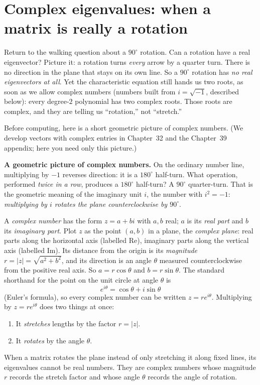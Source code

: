 \section{Complex eigenvalues: when a matrix is really a rotation}
\label{ch23:complex}

Return to the walking question about a $90^\circ$ rotation. Can a rotation have a
real eigenvector? Picture it: a rotation turns \emph{every} arrow by a quarter
turn. There is no direction in the plane that stays on its own line. So a $90^\circ$
rotation has \emph{no real eigenvectors at all}. Yet the characteristic equation
still hands us two roots, as soon as we allow complex numbers (numbers built
from $i=\sqrt{-1}$, described below): every degree-$2$ polynomial has two complex
roots. Those roots are complex, and they are telling us ``rotation,''
not ``stretch.''

Before computing, here is a short geometric picture of complex numbers. (We
develop vectors with complex entries in Chapter~32 and the Chapter~39 appendix;
here you need only this picture.)

\begin{intuitionbox}
\textbf{A geometric picture of complex numbers.}
On the ordinary number line, multiplying by $-1$ reverses direction: it is a
$180^\circ$ half-turn. What operation, performed \emph{twice in a row}, produces a
$180^\circ$ half-turn? A $90^\circ$ quarter-turn. That is the geometric meaning of the
imaginary unit $i$, the number with $i^2=-1$: \emph{multiplying by $i$ rotates the
plane counterclockwise by $90^\circ$}.

A \emph{complex number} has the form $z = a + bi$ with $a,b$ real; $a$ is its
\emph{real part} and $b$ its \emph{imaginary part}. Plot $z$ as the point $(a,b)$
in a plane, the \emph{complex plane}: real parts along the horizontal axis
(labelled Re), imaginary parts along the vertical axis (labelled Im).
Its distance from the origin is its \emph{magnitude} $r = |z| = \sqrt{a^2+b^2}$, and
its direction is an angle $\theta$ measured counterclockwise from the positive real
axis. So $a=r\cos\theta$ and $b=r\sin\theta$. The standard shorthand for the point
on the unit circle at angle $\theta$ is
\[
  e^{i\theta} = \cos\theta + i\sin\theta
\]
(Euler's formula), so every complex number can be written $z = r e^{i\theta}$.
Multiplying by $z = r e^{i\theta}$ does two things at once:
\begin{enumerate}
  \item It \emph{stretches} lengths by the factor $r = |z|$.
  \item It \emph{rotates} by the angle $\theta$.
\end{enumerate}
When a matrix rotates the plane instead of only stretching it along fixed lines, its
eigenvalues cannot be real numbers. They are complex numbers whose
magnitude $r$ records the stretch factor and whose angle $\theta$ records the
angle of rotation.
\end{intuitionbox}

